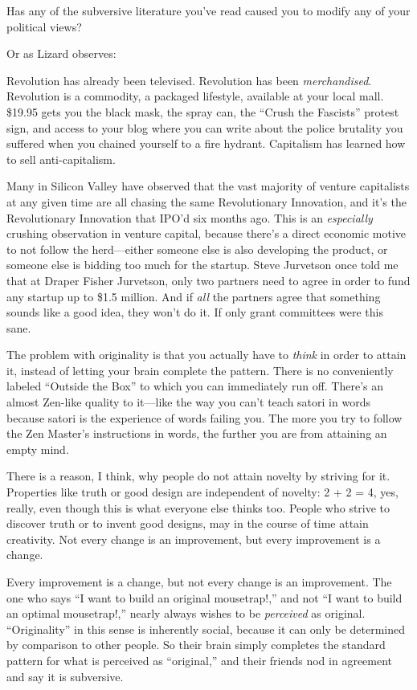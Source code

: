 {
 Has any of the subversive literature you've read
caused you to modify any of your political views?}

{
 Or as Lizard observes:}

{
 Revolution has already been televised. Revolution has been
\textit{merchandised}. Revolution is a commodity, a packaged lifestyle,
available at your local mall. \$19.95 gets you the black mask, the
spray can, the ``Crush the
Fascists'' protest sign, and access to your blog
where you can write about the police brutality you suffered when you
chained yourself to a fire hydrant. Capitalism has learned how to sell
anti-capitalism.}

{
 Many in Silicon Valley have observed that the vast majority of
venture capitalists at any given time are all chasing the same
Revolutionary Innovation, and it's the Revolutionary
Innovation that IPO'd six months ago. This is an
\textit{especially} crushing observation in venture capital, because
there's a direct economic motive to not follow the
herd---either someone else is also developing the product, or someone
else is bidding too much for the startup. Steve Jurvetson once told me
that at Draper Fisher Jurvetson, only two partners need to agree in
order to fund any startup up to \$1.5 million. And if \textit{all} the
partners agree that something sounds like a good idea, they
won't do it. If only grant committees were this sane.}

{
 The problem with originality is that you actually have to
\textit{think} in order to attain it, instead of letting your brain
complete the pattern. There is no conveniently labeled
``Outside the Box'' to which you can
immediately run off. There's an almost Zen-like quality
to it---like the way you can't teach satori in words
because satori is the experience of words failing you. The more you try
to follow the Zen Master's instructions in words, the
further you are from attaining an empty mind.}

{
 There is a reason, I think, why people do not attain novelty by
striving for it. Properties like truth or good design are independent
of novelty: 2 + 2 = 4, yes, really, even though this is what everyone
else thinks too. People who strive to discover truth or to invent good
designs, may in the course of time attain creativity. Not every change
is an improvement, but every improvement is a change.}

{
 Every improvement is a change, but not every change is an
improvement. The one who says ``I want to build an
original mousetrap!,'' and not ``I
want to build an optimal mousetrap!,'' nearly always
wishes to be \textit{perceived} as original.
``Originality'' in this sense is
inherently social, because it can only be determined by comparison to
other people. So their brain simply completes the standard pattern for
what is perceived as ``original,''
and their friends nod in agreement and say it is subversive.}

